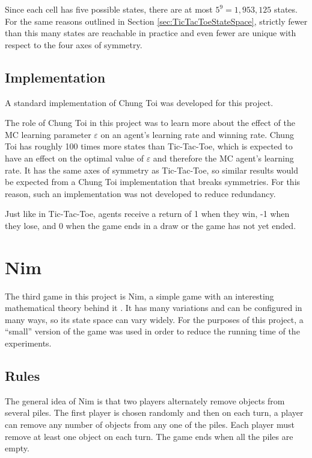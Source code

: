 \documentclass[11pt,a4paper]{report}
\begin{document}
Since each cell has five possible states, there are at most $5^9 = 1,953,125$ states. For the same reasons outlined in Section \ref{sec:TicTacToeStateSpace}, strictly fewer than this many states are reachable in practice and even fewer are unique with respect to the four axes of symmetry.


\subsection{Implementation}

A standard implementation of Chung Toi was developed for this project.

The role of Chung Toi in this project was to learn more about the effect of the MC learning parameter $\varepsilon$ on an agent's learning rate and winning rate. Chung Toi has roughly 100 times more states than Tic-Tac-Toe, which is expected to have an effect on the optimal value of $\varepsilon$ and therefore the MC agent's learning rate. It has the same axes of symmetry as Tic-Tac-Toe, so similar results would be expected from a Chung Toi implementation that breaks symmetries. For this reason, such an implementation was not developed to reduce redundancy.

Just like in Tic-Tac-Toe, agents receive a return of 1 when they win, -1 when they lose, and 0 when the game ends in a draw or the game has not yet ended.


\newpage

\section{Nim}
\label{sec:Nim}

The third game in this project is Nim, a simple game with an interesting mathematical theory behind it \cite{nim-rules}. It has many variations and can be configured in many ways, so its state space can vary widely. For the purposes of this project, a ``small'' version of the game was used in order to reduce the running time of the experiments.


\subsection{Rules}

The general idea of Nim \cite{nim-rules} is that two players alternately remove objects from several piles. The first player is chosen randomly and then on each turn, a player can remove any number of objects from any one of the piles. Each player must remove at least one object on each turn. The game ends when all the piles are empty.
\end{document}
